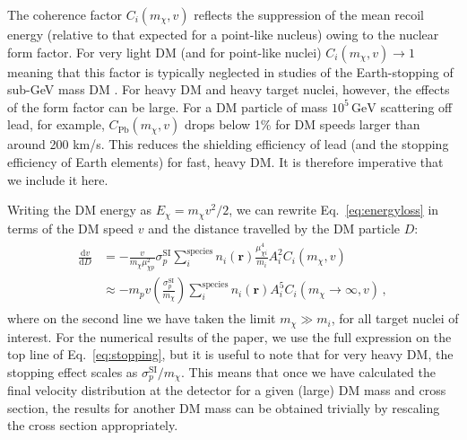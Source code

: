 \documentclass[prd,twocolumn,showpacs,nofootinbib,aps]{revtex4-1}
\newcommand{\dbd}[2]{\frac{\mathrm{d}#1}{\mathrm{d}#2}}
\begin{document}
The coherence factor $C_i(m_\chi, v)$ reflects the suppression of the mean recoil energy (relative to that expected for a point-like nucleus) owing to the nuclear form factor. For very light DM (and for point-like nuclei) $C_i(m_\chi, v) \rightarrow 1$ meaning that this factor is typically neglected in studies of the Earth-stopping of sub-GeV mass DM \cite{Davis:2017noy}. For heavy DM and heavy target nuclei, however, the effects of the form factor can be large. For a DM particle of mass $10^5 \,\mathrm{GeV}$ scattering off lead, for example, $C_\mathrm{Pb}(m_\chi, v)$ drops below 1\% for DM speeds larger than around 200 km/s. This reduces the shielding efficiency of lead (and the stopping efficiency of Earth elements) for fast, heavy DM. It is therefore imperative that we include it here.

Writing the DM energy as $E_\chi = m_\chi v^2/2$, we can rewrite Eq.~\eqref{eq:energyloss} in terms of the DM speed $v$ and the distance travelled by the DM particle $D$:
\begin{align}
\begin{split}
\label{eq:stopping}
\dbd{v}{D} &= -\frac{v}{m_\chi \mu_{\chi p}^2} \sigma_p^{\mathrm{SI}}\sum_i^{\mathrm{species}} n_i (\mathbf{r}) \frac{\mu_{\chi i}^4}{m_i} A_i^2 C_i(m_\chi, v)\\
&\approx -m_p v \left(\frac{\sigma_p^{\mathrm{SI}}}{m_\chi}\right) \sum_i^{\mathrm{species}} n_i (\mathbf{r}) A_i^5 C_i(m_\chi \rightarrow \infty,v)\,,
\end{split}
\end{align}
where on the second line we have taken the limit $m_\chi \gg m_i$, for all target nuclei of interest. For the numerical results of the paper, we use the full expression on the top line of Eq.~\eqref{eq:stopping}, but it is useful to note that for very heavy DM, the stopping effect scales as $\sigma_p^{\mathrm{SI}}/m_\chi$. This means that once we have calculated the final velocity distribution at the detector for a given (large) DM mass and cross section, the results for another DM mass can be obtained trivially by rescaling the cross section appropriately.

\end{document}
